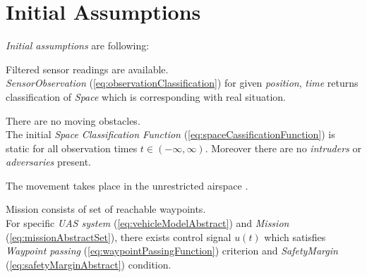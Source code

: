 \section{Initial Assumptions} \label{s:initialAssumptions}
    \noindent\emph{Initial assumptions} are following:

    \begin{assumption}
        {Filtered sensor readings are available}\label{ass:filteredSensors}.\\
        \emph{SensorObservation} (\ref{eq:observationClassification}) for given \emph{position}, \emph{time} returns classification of \emph{Space} which is corresponding with real situation.
    \end{assumption}
    
    \begin{assumption}
        {There are no moving obstacles}\label{ass:noMovingObstacles}.\\
        The initial \emph{Space Classification Function} (\ref{eq:spaceCassificationFunction}) is static for all observation times $t \in (-\infty,\infty)$. Moreover there are no \emph{intruders} or \emph{adversaries} present. 
    \end{assumption}

    \begin{assumption}
        {The movement takes place in the unrestricted airspace }\label{ass:openAir}.
    \end{assumption}

    \begin{assumption}
        {Mission consists of set of reachable waypoints}\label{ass:reachableWaypoints}.\\
        For specific \emph{UAS system} (\ref{eq:vehicleModelAbstract}) and  \emph{Mission} (\ref{eq:missionAbstractSet}), there exists control signal $u(t)$ which satisfies \emph{Waypoint passing} (\ref{eq:waypointPassingFunction}) criterion and \emph{SafetyMargin} (\ref{eq:safetyMarginAbstract}) condition.
    \end{assumption}
    
